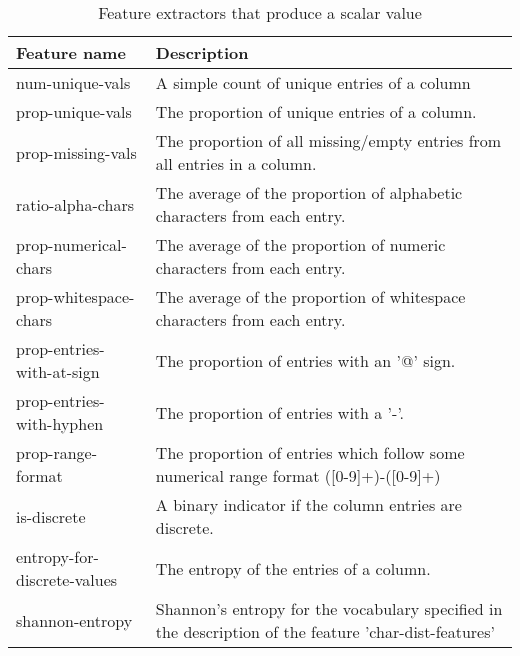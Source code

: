 \documentclass[letterpaper]{article} %
\begin{document}
\begin{table}[h]
	\centering
	\caption{Feature extractors that produce a scalar value}
	\begin{tabular}{p{3cm}p{4.5cm}}
	Feature name & Description \\ \hline
	num-unique-vals & A simple count of unique entries of a column\\
	\rowcolor{Gray}
	prop-unique-vals & The proportion of unique entries of a column. \\
	\rowcolor{Gray}
	prop-missing-vals & The proportion of all missing/empty entries from all entries in a column.\\
	ratio-alpha-chars & The average of the proportion of alphabetic characters from each entry.\\
	\rowcolor{Gray}
	prop-numerical-chars & The average of the proportion of numeric characters from each entry.\\
	prop-whitespace-chars    & The average of the proportion of whitespace characters from each entry.\\
	\rowcolor{Gray}
	prop-entries-with-at-sign& The proportion of entries with an '@' sign. \\
	prop-entries-with-hyphen & The proportion of entries with a '-'. \\
	\rowcolor{Gray}
	prop-range-format        & The proportion of entries which follow some numerical range format   ([0-9]+)-([0-9]+) \\
	is-discrete              & A binary indicator if the column entries are discrete. \\
	\rowcolor{Gray}
	entropy-for-discrete-values & The entropy of the entries of a column.\\
	shannon-entropy          & Shannon's entropy for the vocabulary specified in the description of the feature 'char-dist-features'\\
	\end{tabular}
\end{table}
\end{document}
